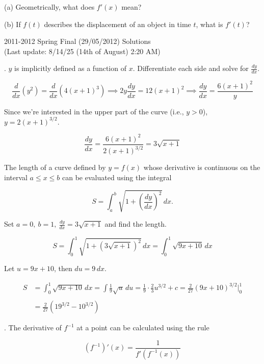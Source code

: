 \documentclass{article}
\begin{document}
\noindent (a) Geometrically, what does $f'(x)$ mean?

\hfill

\noindent (b) If $f(t)$ describes the displacement of an object in time $t$, what is $f'(t)$?

\newpage

\begin{center}
2011-2012 Spring Final (29/05/2012) Solutions\\
(Last update: 8/14/25 (14th of August) 2:20 AM)
\end{center}

. $y$ is implicitly defined as a function of $x$. Differentiate each side and solve for $\displaystyle \frac{dy}{dx}$.

\[\frac d{dx}\left(y^2\right)=\frac d{dx}\left(4(x+1)^3\right)\implies 2y\frac{dy}{dx}=12(x+1)^2\implies\frac{dy}{dx}=\frac{6(x+1)^2}y\]

\hfill

\noindent Since we're interested in the upper part of the curve (i.e., $y>0$), $y=2(x+1)^{3/2}$.

\[\frac{dy}{dx}=\frac{6(x+1)^2}{2(x+1)^{3/2}}=3\sqrt{x+1}\]

\hfill

\noindent The length of a curve defined by $y=f(x)$ whose derivative is continuous on the interval $a\leq x\leq b$ can be evaluated using the integral

\[S=\int_a^b\sqrt{1+\left(\frac{dy}{dx}\right)^2}\,dx.\]

\hfill

\noindent Set $\displaystyle a=0,\:b=1,\:\frac{dy}{dx}=3\sqrt{x+1}$ and find the length.

\[S=\int_0^1\sqrt{1+\left(3\sqrt{x+1}\right)^2}\,dx=\int_0^1\sqrt{9x+10}\,dx\]

\hfill

\noindent Let $u=9x+10$, then $du=9\,dx$.

\begin{align*}
S&=\int_0^1\sqrt{9x+10}\,dx=\int\frac19\sqrt{u}\,du=\frac19\cdot\frac23u^{3/2}+c=\frac2{27}\left(9x+10\right)^{3/2}\bigg|_0^1\\\\&=\boxed{\frac2{27}\left(19^{3/2}-10^{3/2}\right)}
\end{align*}

\hfill

. The derivative of $f^{-1}$ at a point can be calculated using the rule

\[\left(f^{-1}\right)'(x)=\frac1{f'\left(f^{-1}(x)\right)}\]
\end{document}
